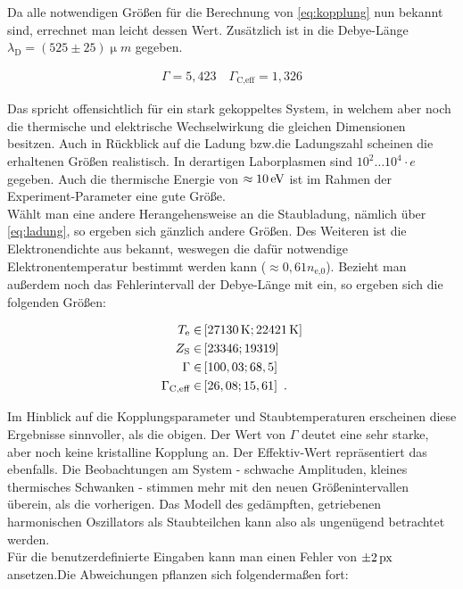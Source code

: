 \documentclass[numbers=noenddot,a4paper,notitlepage,twoside,BCOR15mm]{scrartcl}
\newcommand{\tenpo}[1]{ 10^{#1}}
\newcommand{\ix}[1]{_\text{#1}}
\begin{document}
		Da alle notwendigen Größen für die Berechnung von \autoref{eq:kopplung} nun bekannt sind, errechnet man leicht dessen Wert. Zusätzlich ist in \cite{EMAUGreifswaldPlasm} die Debye-Länge $\lambda\ix{D}=(525\pm25)\unit{\upmu m}$ gegeben.

			\begin{align}
				\Gamma=5,423\quad\Gamma\ix{C,eff}=1,326 \label{eq:koppwert}
			\end{align}

		Das spricht offensichtlich für ein stark gekoppeltes System, in welchem aber noch die thermische und elektrische Wechselwirkung die gleichen Dimensionen besitzen. Auch in Rückblick auf die Ladung bzw.die Ladungszahl scheinen die erhaltenen Größen realistisch. In derartigen Laborplasmen sind $\tenpo{2}\dots\tenpo{4}\cdot e$ gegeben. Auch die thermische Energie von $\approx\unit[10]{eV}$ ist im Rahmen der Experiment-Parameter eine gute Größe.\\
		Wählt man eine andere Herangehensweise an die Staubladung, nämlich über \autoref{eq:ladung}, so ergeben sich gänzlich andere Größen. Des Weiteren ist die Elektronendichte aus \cite{EMAUGreifswaldPlasm} bekannt, weswegen die dafür notwendige Elektronentemperatur bestimmt werden kann ($\approx0,61n\ix{e,0}$). Bezieht man außerdem noch das Fehlerintervall der Debye-Länge mit ein, so ergeben sich die folgenden Größen:

			\begin{align}
				T\ix{e}\in&\left[\unit[27130]{K}; \unit[22421]{K}\right] \nonumber\\
				Z\ix{S}\in&\left[23346; 19319\right] \nonumber\\
				\Gamma\in&\left[100,03; 68,5\right] \nonumber\\
				\Gamma\ix{C,eff}\in&\left[26,08; 15,61\right]\,\,. \nonumber
			\end{align}

		Im Hinblick auf die Kopplungsparameter und Staubtemperaturen erscheinen diese Ergebnisse sinnvoller, als die obigen. Der Wert von $\Gamma$ deutet eine sehr starke, aber noch keine kristalline Kopplung an. Der Effektiv-Wert repräsentiert das ebenfalls. Die Beobachtungen am System - schwache Amplituden, kleines thermisches Schwanken - stimmen mehr mit den neuen Größenintervallen überein, als die vorherigen. Das Modell des gedämpften, getriebenen harmonischen Oszillators als Staubteilchen kann also als ungenügend betrachtet werden.\\
		Für die benutzerdefinierte Eingaben kann man einen Fehler von $\pm\unit[2]{px}$ ansetzen.Die Abweichungen pflanzen sich folgendermaßen fort:
\end{document}
